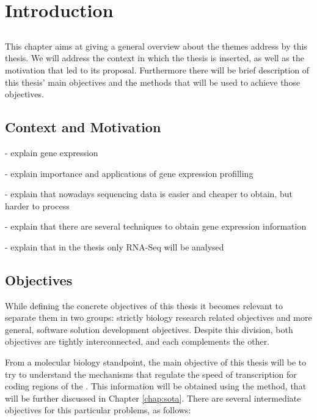 \chapter{Introduction} \label{chap:intro}

\section*{}

This chapter aims at giving a general overview about the themes address by this
thesis. We will address the context in which the thesis is inserted, as well as
the motivation that led to its proposal. Furthermore there will be brief
description of this thesis' main objectives and the methods that will be used to
achieve those objectives.

\section{Context and Motivation} \label{sec:context}

- explain gene expression

- explain importance and applications of gene expression profilling

- explain that nowadays sequencing data is easier and cheaper to obtain, but
  harder to process

- explain that there are several techniques to obtain gene expression
  information

- explain that in the thesis only RNA-Seq will be analysed

\section{Objectives} \label{sec:goals}

While defining the concrete objectives of this thesis it becomes relevant to
separate them in two groups: strictly biology research related objectives and
more general, software solution development objectives. Despite this division,
both objectives are tightly interconnected, and each complements the other.

From a molecular biology standpoint, the main objective of this thesis will be
to try to understand the mechanisms that regulate the speed of transcription for
coding regions of the \dna. This information will be obtained using the
\rnaseq{} method, that will be further discussed in Chapter \ref{chap:sota}.
There are several intermediate objectives for this particular problems, as
follows:

